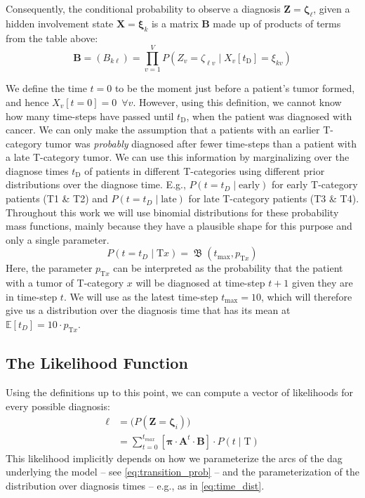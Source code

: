\documentclass[twocolumn]{aastex631}
\begin{document}
Consequently, the conditional probability to observe a diagnosis $\mathbf{Z}=\boldsymbol{\zeta}_\ell$, given a hidden involvement state $\mathbf{X}=\boldsymbol{\xi}_k$ is a matrix $\mathbf{B}$ made up of products of terms from the table above:
%
\begin{equation} \label{eq:transition_matrix}
    \mathbf{B} = \left( B_{k\ell} \right) = \prod_{v=1}^V P\left( Z_v = \zeta_{\ell v} \mid X_v[t_\text{D}] = \xi_{kv} \right)
\end{equation}

We define the time $t=0$ to be the moment just before a patient's tumor formed, and hence $X_v[t=0]=0 \,\,\, \forall v$. However, using this definition, we cannot know how many time-steps have passed until $t_\text{D}$, when the patient was diagnosed with cancer. We can only make the assumption that a patients with an earlier T-category tumor was \emph{probably} diagnosed after fewer time-steps than a patient with a late T-category tumor. We can use this information by marginalizing over the diagnose times $t_\text{D}$ of patients in different T-categories using different prior distributions over the diagnose time. E.g., $P \left( t=t_D \mid \text{early} \right)$ for early T-category patients (T1 \& T2) and $P \left( t=t_D \mid \text{late} \right)$ for late T-category patients (T3 \& T4). Throughout this work we will use binomial distributions for these probability mass functions, mainly because they have a plausible shape for this purpose and only a single parameter.
%
\begin{equation} \label{eq:time_dist}
    P \left( t = t_D \mid \text{T}x \right) = \operatorname{\mathfrak{B}}(t_\text{max},p_{\text{T}x})
\end{equation}
%
Here, the parameter $p_{\text{T}x}$ can be interpreted as the probability that the patient with a tumor of T-category $x$ will be diagnosed at time-step $t+1$ given they are in time-step $t$. We will use as the latest time-step $t_\text{max} = 10$, which will therefore give us a distribution over the diagnosis time that has its mean at $\mathbb{E}[t_D] = 10 \cdot p_{\text{T}x}$.


\subsection{The Likelihood Function}
\label{subsec:formalism:likelihood}

Using the definitions up to this point, we can compute a vector of likelihoods for every possible diagnosis:
%
\begin{equation} \label{eq:likelihood_vec}
\begin{split}
    \boldsymbol{\ell} &= \big( P\left( \mathbf{Z} = \boldsymbol{\zeta}_i \right) \big) \\
    &= \sum_{t=0}^{t_{max}} \left[ \boldsymbol{\pi} \cdot \mathbf{A}^t \cdot \mathbf{B} \right] \cdot P \left( t \mid \text{T} \right)
\end{split}
\end{equation}
%
This likelihood implicitly depends on how we parameterize the arcs of the \gls{dag} underlying the model -- see \cref{eq:transition_prob} -- and the parameterization of the distribution over diagnosis times -- e.g., as in \cref{eq:time_dist}. 
\end{document}

